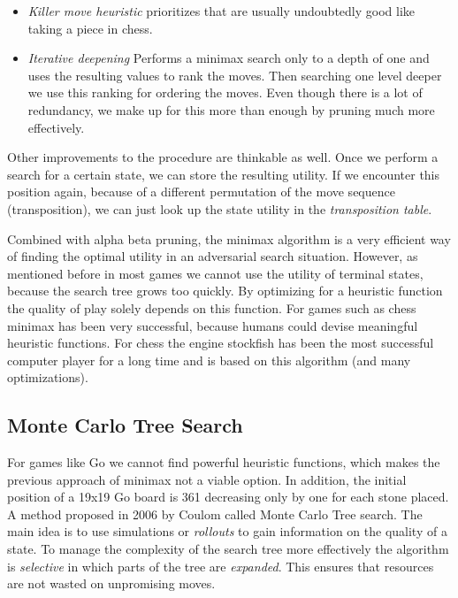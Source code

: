 \begin{itemize}
    \item \textit{Killer move heuristic} prioritizes that are usually undoubtedly good like taking a piece in chess.
    \item \textit{Iterative deepening} Performs a minimax search only to a depth of one and uses the resulting values to rank the moves. Then searching one level deeper we use this ranking for ordering the moves. Even though there is a lot of redundancy, we make up for this more than enough by pruning much more effectively.
\end{itemize}

Other improvements to the procedure are thinkable as well. Once we perform a search for a certain state, we can store the resulting utility. If we encounter this position again, because of a different permutation of the move sequence (transposition), we can just look up the state utility in the \textit{transposition table}.

Combined with alpha beta pruning, the minimax algorithm is a very efficient way of finding the optimal utility in an adversarial search situation. However, as mentioned before in most games we cannot use the utility of terminal states, because the search tree grows too quickly. By optimizing for a heuristic function the quality of play solely depends on this function. For games such as chess minimax has been very successful, because humans could devise meaningful heuristic functions. For chess the engine stockfish has been the most successful computer player for a long time and is based on this algorithm (and many optimizations). \cite{noauthor_stockfish_2021, noauthor_stockfish_nodate}

\subsection{Monte Carlo Tree Search}
For games like Go we cannot find powerful heuristic functions, which makes the previous approach of minimax not a viable option. In addition, the initial position of a 19x19 Go board is 361 decreasing only by one for each stone placed. A method proposed in 2006 by Coulom \cite{coulom_efficient_2007} called Monte Carlo Tree search. The main idea is to use simulations or \textit{rollouts} to gain information on the quality of a state. To manage the complexity of the search tree more effectively the algorithm is \textit{selective} in which parts of the tree are \textit{expanded}. This ensures that resources are not wasted on unpromising moves.

